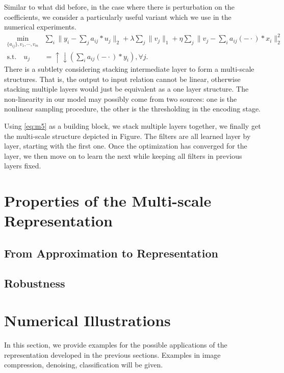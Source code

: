 \documentclass[a4paper]{article}
\begin{document}
Similar to what did before, in the case where there is perturbation on the coefficients, we consider a particularly useful variant which we use in the numerical experiments.
\begin{equation}
\label{eq:m5}
\begin{aligned}
	\min_{\{a_{ij}\}, v_1,\cdots,v_m}& \sum_i \|y_i - \sum_j a_{ij}*u_j\|_2 +\lambda \sum_j \|v_j\|_1 + \eta \sum_j \|v_j-  \sum_{i} a_{ij}(-\cdot)*x_i \|_2^2\\
	 \textrm{s.t.}  	\quad 	u_j&=\uparrow\downarrow(\sum_i a_{ij}(-\cdot)*y_i), \forall j.
	\end{aligned}
\end{equation}
There is a subtlety considering stacking intermediate layer to form a multi-scale structures. That is, the output to input relation cannot be linear, otherwise stacking multiple layers would just be equivalent as a one layer structure. The non-linearity in our model may possibly come from two sources: one is the nonlinear sampling procedure, the other is the thresholding in the encoding stage.

Using \eqref{eq:m5} as a building block, we stack multiple layers together, we finally get the multi-scale structure depicted in Figure. The filters are all learned layer by layer, starting with the first one. Once the optimization has converged for the layer, we then move on to learn the next while keeping all filters in previous layers fixed.

\section{Properties of the Multi-scale Representation}
\subsection{From Approximation to Representation}
\subsection{Robustness}


\section{Numerical Illustrations}
In this section, we provide examples for the possible applications of the representation developed in the previous sections. Examples in image compression, denoising, classification will be given. 
\end{document}
